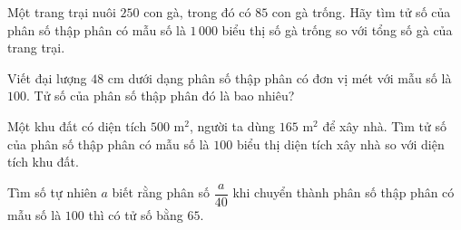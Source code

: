 \begin{ex} %
Một trang trại nuôi $250$ con gà, trong đó có $85$ con gà trống. Hãy tìm tử số của phân số thập phân có mẫu số là $1\,000$ biểu thị số gà trống so với tổng số gà của trang trại.
\end{ex}

\begin{ex} %
Viết đại lượng $48\text{ cm}$ dưới dạng phân số thập phân có đơn vị mét với mẫu số là $100$. Tử số của phân số thập phân đó là bao nhiêu?
\end{ex}

\begin{ex} %
Một khu đất có diện tích $500\text{ m}^2$, người ta dùng $165\text{ m}^2$ để xây nhà. Tìm tử số của phân số thập phân có mẫu số là $100$ biểu thị diện tích xây nhà so với diện tích khu đất.
\end{ex}

\begin{ex} %
Tìm số tự nhiên $a$ biết rằng phân số $\dfrac{a}{40}$ khi chuyển thành phân số thập phân có mẫu số là $100$ thì có tử số bằng $65$.
\end{ex}
